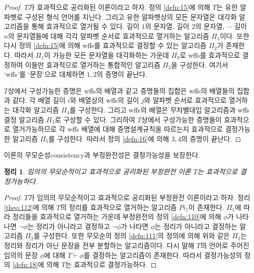 \documentclass[a4paper,chapter,atbegshi]{oblivoir}
\newtheorem{theo}{정리}[chapter]
\begin{document}
\begin{proof}
  $T$가 효과적으로 공리화된 이론이라고 하자. 정의 \ref{defn:15}에 의해
  $T$는 유한 알파벳로 구성된 형식 언어를 지닌다. 그리고 유한 알파벳상의
  모든 문자열은 대각화 알고리즘을 통해 효과적으로 열거될 수 있다. 길이
  $1$의 문자열, 길이 $2$의 문자열, $\cdots$ 길이 $n$의 문자열들에 대해 
  각각 알파벳 순서로 효과적으로 열거하는 알고리즘 $\Pi_1$이다. 또한 다시
  정의 \ref{defn:15}에 의해 wffs를 효과적으로 결정할 수 있는 알고리즘
  $\Pi_2$가 존재한다. 따라서 $\Pi_1$이 가능한 모든 문자열을 대각화하는
  가운데 $\Pi_2$로 wffs를 효과적으로 결정하여 이들만 효과적으로 열거하는
  통합적인 알고리즘 $\Pi_3$을 구성한다. 여기서 `wffs'를 `문장'으로
  대체하면 $1,2$의 증명이 끝난다.

  $T$상에서 구성가능한 증명은 wffs의 배열과 같고 증명들의 집합은 wffs의
  배열들의 집합과 같다. 각 배열 길이 $i$와 배열상의 wffs의 길이 $j$와
  알파벳 순서로 효과적으로 열거하는 대각화 알고리즘 $\Pi_4$를 구성한다. 
  그리고 wffs의 배열은 무차별대입 알고리즘과 wffs 결정 알고리즘 $\Pi_2$로
  구성할 수 있다. 그리하여 $T$상에서 구성가능한 증명들이 효과적으로 
  열거가능하므로 각 wffs 배열에 대해 증명설계규칙을 따르는지 효과적으로
  결정가능한 알고리즘 $\Pi_5$를 구성한다. 따라서 정의 \ref{defn:16}에 의해
  $3,4$의 증명이 끝난다.
\end{proof}
이론의 무모순성{\tiny consistency}과 부정완전성은 결정가능성을 보장한다.
\begin{theo}\label{theo:113}
  임의의 무모순적이고 효과적으로 공리화된 부정완전 이론 $T$는 효과적으로
  결정가능하다.
\end{theo}
\begin{proof}
  $T$가 임의의 무모순적이고 효과적으로 공리화된 부정완전 이론이라고 하자.
  정리 \ref{theo:112}에 의해 $T$의 정리를 효과적으로 열거하는 알고리즘 $Pi_1$이
  존재한다. $\Pi_1$에 따라 정리들을 효과적으로 열거하는 가운데 부정완전의 정의
  \ref{defn:110}에 의해 $\phi$가 나타나면 $\neg\phi$는 정리가
  아니라고 결정하고 $\neg\phi$가 나타면 $\phi$는 정리가 아니라고 결정하는
  알고리즘 $\Pi_2$를 구성한다. 또한 무모순의 정의 \ref{defn:111}의 정의에
  의해 위와 같은 $\Pi_2$는 정리와 정리가 아닌 문장을 전부 분할하는 알고리즘이다.
  다시 말해 $T$의 언어로 주어진 임의의 문장 $\phi$에 대해 $T\vdash\phi$를
  결정하는 알고리즘이 존재한다. 따라서 결정가능성의 정의 \ref{defn:18}에 의해
  $T$는 효과적으로 결정가능하다.
\end{proof}
\end{document}
